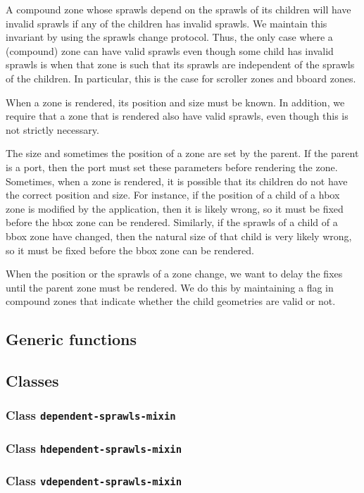 \documentclass{report}
\begin{document}
A compound zone whose sprawls depend on the sprawls of its children will
have invalid sprawls if any of the children has invalid sprawls.  We
maintain this invariant by using the sprawls change protocol.  Thus, the
only case where a (compound) zone can have valid sprawls even though
some child has invalid sprawls is when that zone is such that its sprawls
are independent of the sprawls of the children.  In particular, this is
the case for scroller zones and bboard zones.

When a zone is rendered, its position and size must be known.  In
addition, we require that a zone that is rendered also have valid
sprawls, even though this is not strictly necessary.

The size and sometimes the position of a zone are set by the parent.
If the parent is a port, then the port must set these parameters
before rendering the zone.  Sometimes, when a zone is rendered, it is
possible that its children do not have the correct position and size.
For instance, if the position of a child of a hbox zone is modified by
the application, then it is likely wrong, so it must be fixed before
the hbox zone can be rendered.  Similarly, if the sprawls of a child of
a bbox zone have changed, then the natural size of that child is very
likely wrong, so it must be fixed before the bbox zone can be
rendered.

When the position or the sprawls of a zone change, we want to delay the
fixes until the parent zone must be rendered.  We do this by
maintaining a flag in compound zones that indicate whether the child
geometries are valid or not.  

\subsection{Generic functions}

\subsection{Classes}

\subsubsection{Class \texttt{dependent-sprawls-mixin}}
\subsubsection{Class \texttt{hdependent-sprawls-mixin}}
\subsubsection{Class \texttt{vdependent-sprawls-mixin}}
\end{document}
